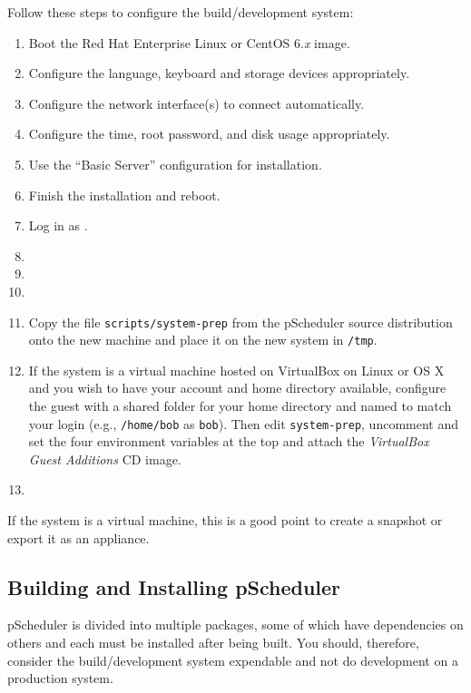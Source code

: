 \documentclass[10pt,titlepage]{article}
\begin{document}
Follow these steps to configure the build/development system:

\begin{enumerate}
\item Boot the Red Hat Enterprise Linux or CentOS 6.{\it x} image.
\item Configure the language, keyboard and storage devices
  appropriately.
\item Configure the network interface(s) to connect automatically.
\item Configure the time, root password, and disk usage appropriately.
\item Use the ``Basic Server'' configuration for installation.
\item Finish the installation and reboot.
\item Log in as \root.
\item {}
\item {}
\item {}
\item Copy the file {\tt scripts/system-prep} from the pScheduler
  source distribution onto the new machine and place it on the new
  system in {\tt /tmp}.
\item If the system is a virtual machine hosted on VirtualBox on Linux
  or OS X and you wish to have your account and home directory
  available, configure the guest with a shared folder for your home
  directory and named to match your login (e.g., {\tt /home/bob} as
  {\tt bob}).  Then edit {\tt system-prep}, uncomment and set the four
  environment variables at the top and attach the {\it VirtualBox
    Guest Additions} CD image.
\item {}
\end{enumerate}

If the system is a virtual machine, this is a good point to create a
snapshot or export it as an appliance.


\subsection{Building and Installing pScheduler}

pScheduler is divided into multiple packages, some of which have
dependencies on others and each must be installed after being built.
You should, therefore, consider the build/development system
expendable and not do development on a production system.
\end{document}
